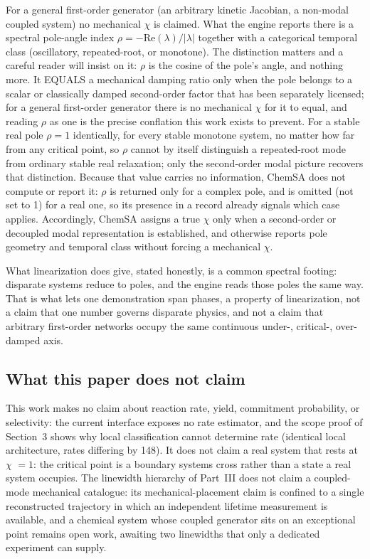 For a general first-order generator (an arbitrary kinetic Jacobian, a non-modal coupled system) no mechanical $\chi$ is claimed. What the engine reports there is a spectral pole-angle index \(\rho = -\mathrm{Re}(\lambda)/|\lambda|\) together with a categorical temporal class (oscillatory, repeated-root, or monotone). The distinction matters and a careful reader will insist on it: \(\rho\) is the cosine of the pole's angle, and nothing more. It EQUALS a mechanical damping ratio only when the pole belongs to a scalar or classically damped second-order factor that has been separately licensed; for a general first-order generator there is no mechanical \(\chi\) for it to equal, and reading \(\rho\) as one is the precise conflation this work exists to prevent. For a stable real pole \(\rho = 1\) identically, for every stable monotone system, no matter how far from any critical point, so \(\rho\) cannot by itself distinguish a repeated-root mode from ordinary stable real relaxation; only the second-order modal picture recovers that distinction. Because that value carries no information, ChemSA does not compute or report it: \(\rho\) is returned only for a complex pole, and is omitted (not set to 1) for a real one, so its presence in a record already signals which case applies. Accordingly, ChemSA assigns a true $\chi$ only when a second-order or decoupled modal representation is established, and otherwise reports pole geometry and temporal class without forcing a mechanical $\chi$.

What linearization does give, stated honestly, is a common spectral footing: disparate systems reduce to poles, and the engine reads those poles the same way. That is what lets one demonstration span phases, a property of linearization, not a claim that one number governs disparate physics, and not a claim that arbitrary first-order networks occupy the same continuous under-, critical-, over-damped axis.

\subsection{What this paper does not claim}

This work makes no claim about reaction rate, yield, commitment probability, or selectivity: the current interface exposes no rate estimator, and the scope proof of Section~3 shows why local classification cannot determine rate (identical local architecture, rates differing by 148). It does not claim a real system that rests at $\chi$ \(=1\): the critical point is a boundary systems cross rather than a state a real system occupies. The linewidth hierarchy of Part~III does not claim a coupled-mode mechanical catalogue: its mechanical-placement claim is confined to a single reconstructed trajectory in which an independent lifetime measurement is available, and a chemical system whose coupled generator sits on an exceptional point remains open work, awaiting two linewidths that only a dedicated experiment can supply.

